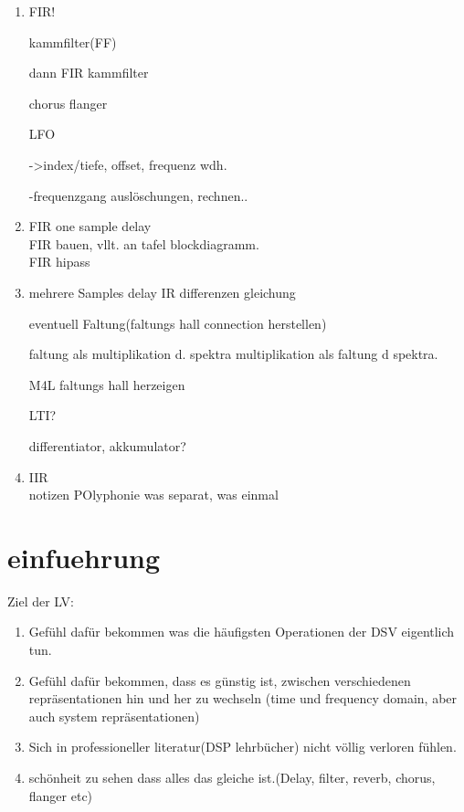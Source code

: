 \begin{enumerate}
	\item FIR!

kammfilter(FF)

dann FIR kammfilter

chorus
flanger

LFO

->index/tiefe, offset, frequenz wdh.


-frequenzgang
ausl\"oschungen, rechnen..

\item 
FIR one sample delay\\

FIR bauen, vllt. an tafel blockdiagramm.\\

FIR hipass\\


\item 

mehrere Samples delay
IR
differenzen gleichung

eventuell Faltung(faltungs hall connection herstellen)

faltung als multiplikation d. spektra
multiplikation als faltung d spektra.

M4L faltungs hall herzeigen

LTI?

differentiator, akkumulator?

\item
IIR\\



notizen POlyphonie
was separat, was einmal

\end{enumerate}

\section{einfuehrung} %
\label{sub:einfuehrung}


Ziel der LV:\\
\begin{enumerate}
	\item Gefühl dafür bekommen was die häufigsten Operationen der DSV eigentlich tun.
	\item Gefühl dafür bekommen, dass es günstig ist, zwischen verschiedenen repräsentationen hin und her zu wechseln (time und frequency domain, aber auch system repräsentationen)
	\item Sich in professioneller literatur(DSP lehrbücher) nicht völlig verloren fühlen.
	\item schönheit zu sehen dass alles das \glqq{}gleiche\grqq{} ist.(Delay, filter, reverb, chorus, flanger etc)
\end{enumerate}

